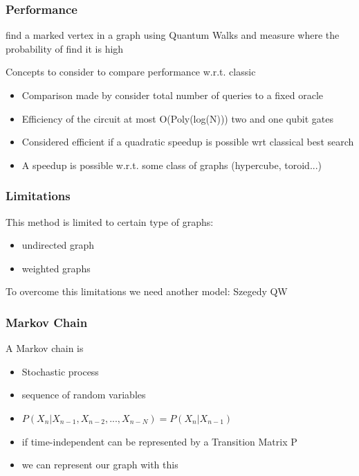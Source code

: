 \documentclass{beamer}
\begin{document}
\begin{frame}
    \frametitle{Performance}
    \begin{definition}
        find a marked vertex in a graph using Quantum Walks
        and measure where the probability of find it is high
    \end{definition}
    Concepts to consider to compare performance w.r.t. classic
    \begin{itemize}
        \item \small Comparison made by consider total number of queries to a fixed oracle
        \item \small Efficiency of the circuit at most O(Poly(log(N))) two and one qubit gates
        \item \small Considered efficient if a quadratic speedup is possible wrt classical best search
        \item \small A speedup is possible w.r.t. some class of graphs (hypercube, toroid...)
    \end{itemize}

\end{frame}

\begin{frame}
    \frametitle{Limitations}
    This method is limited to certain type of graphs:
    \begin{itemize}
        \item undirected graph
        \item weighted graphs
    \end{itemize}
    To overcome this limitations we need another model: Szegedy QW
\end{frame}


\begin{frame}
    \frametitle{Markov Chain}
    A Markov chain is
    \begin{itemize}
        \item Stochastic process
        \item sequence of random variables
        \item $P(X_{n} | X_{n-1}, X_{n-2},...,X_{n-N}) = P(X_{n} | X_{n-1})$
        \item if time-independent can be represented by a Transition Matrix P
        \item we can represent our graph with this 
    \end{itemize} 

\end{frame}
\end{document}
